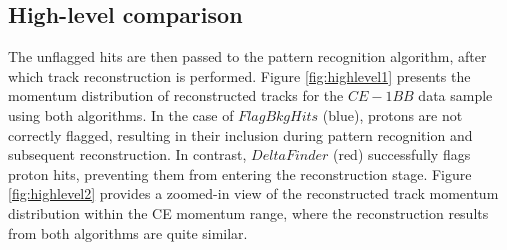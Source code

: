 \subsection{High-level comparison}
The unflagged hits are then passed to the pattern 
recognition algorithm, after which track reconstruction is performed. 
Figure \ref{fig:highlevel1} presents the momentum 
distribution of reconstructed tracks for the $CE-1BB$ 
data sample using both algorithms. 
In the case of $FlagBkgHits$ (blue), protons are not 
correctly flagged, resulting in their inclusion during 
pattern recognition and subsequent reconstruction. 
In contrast, $DeltaFinder$ (red) successfully flags 
proton hits, preventing them from entering the reconstruction stage. 
Figure \ref{fig:highlevel2} provides a zoomed-in view 
of the reconstructed track momentum distribution within 
the CE momentum range, where the reconstruction results 
from both algorithms are quite similar.

